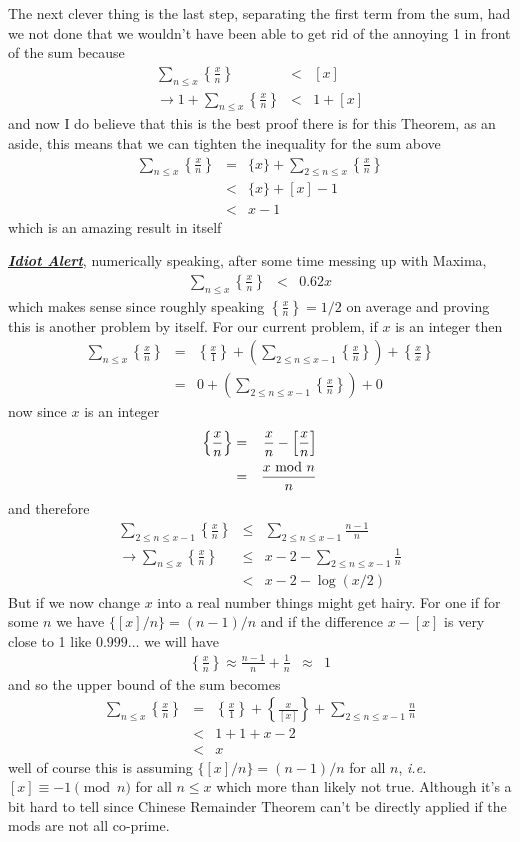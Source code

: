 \documentclass[aps,preprint,preprintnumbers,nofootinbib,showpacs,prd]{revtex4-1}
\newcommand{\ie}{{\it i.e.} }
\newcommand{\nbea}{\begin{eqnarray*}}
\newcommand{\neea}{\end{eqnarray*}}
\begin{document}
The next clever thing is the last step, separating the first term from the sum, had we not done that we wouldn't have been able to get rid of the annoying 1 in front of the sum because
%
\nbea
\sum_{n\le x}\left\{\frac{x}{n}\right\} &<& [x] \\
\to 1 + \sum_{n\le x}\left\{\frac{x}{n}\right\} &<& 1+[x] 
\neea
%
and now I do believe that this is the best proof there is for this Theorem, as an aside, this means that we can tighten the inequality for the sum above
%
\nbea
\sum_{n\le x}\left\{\frac{x}{n}\right\} & = & \{x\} + \sum_{2\le n\le x}\left\{\frac{x}{n}\right\} \\
& < & \{x\} + [x] - 1 \\
& < & x - 1
\neea
%
which is an amazing result in itself

\underline{\textit{\textbf{Idiot Alert}}}, numerically speaking, after some time messing up with Maxima, 
%
\nbea
\sum_{n\le x}\left\{\frac{x}{n}\right\} & < & 0.62 x
\neea
%
which makes sense since roughly speaking $\left\{\frac{x}{n}\right\} = 1/2$ on average and proving this is another problem by itself. For our current problem, if $x$ is an integer then
%
\nbea
\sum_{n\le x} \left\{\frac{x}{n}\right\} & = & \left\{\frac{x}{1}\right\} + \left(\sum_{2\le n\le x-1} \left\{\frac{x}{n}\right\}\right) + \left\{\frac{x}{x}\right\} \\
& = & 0 + \left(\sum_{2\le n\le x-1} \left\{\frac{x}{n}\right\}\right) + 0
\neea
%
now since $x$ is an integer
%
\nbea
\left\{\frac{x}{n}\right\} & = & \frac{x}{n} - \left\lbrack\frac{x}{n}\right\rbrack \\
& = & \frac{x {\rm~mod~} n}{n}
\neea
%
and therefore
%
\nbea
\sum_{2\le n\le x-1} \left\{\frac{x}{n}\right\} & \le & \sum_{2\le n\le x-1} \frac{n-1}{n} \\
\to \sum_{n\le x} \left\{\frac{x}{n}\right\} & \le & x-2 - \sum_{2\le n\le x-1} \frac{1}{n} \\
& < & x-2 - \log(x/2)
\neea
%
But if we now change $x$ into a real number things might get hairy. For one if for some $n$ we have $\{[x]/n\} = (n-1)/n$ and if the difference $x-[x]$ is very close to 1 like $0.999\ldots$ we will have
%
\nbea
\left\{\frac{x}{n}\right\}\approx \frac{n-1}{n} + \frac{1}{n} & \approx & 1
\neea
%
and so the upper bound of the sum becomes
%
\nbea
\sum_{n\le x} \left\{\frac{x}{n}\right\} & = & \left\{\frac{x}{1}\right\} + \left\{\frac{x}{[x]}\right\} + \sum_{2\le n\le x-1} \frac{n}{n} \\
& < & 1 + 1 + x-2 \\
& < & x
\neea
%
well of course this is assuming $\{[x]/n\} = (n-1)/n$ for all $n$, \ie $[x] \equiv -1 \pmod{n}$ for all $n\le x$ which more than likely not true. Although it's a bit hard to tell since Chinese Remainder Theorem can't be directly applied if the mods are not all co-prime.
\end{document}

